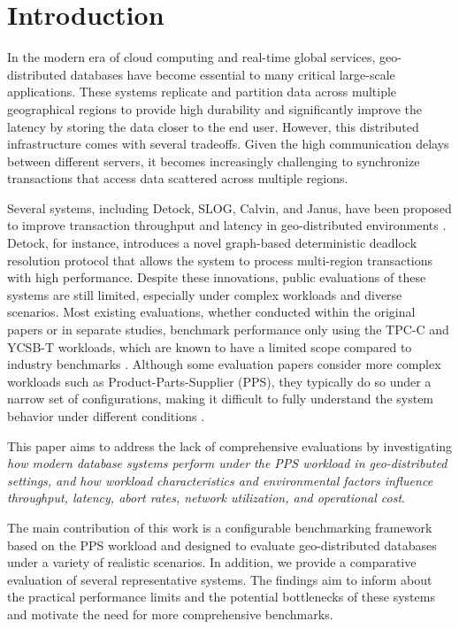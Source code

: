 \section{Introduction}
\label{sec: introduction}

In the modern era of cloud computing and real-time global services, geo-distributed databases have become essential to many critical large-scale applications. These systems replicate and partition data across multiple geographical regions to provide high durability and significantly improve the latency by storing the data closer to the end user. However, this distributed infrastructure comes with several tradeoffs. Given the high communication delays between different servers, it becomes increasingly challenging to synchronize transactions that access data scattered across multiple regions.

Several systems, including Detock, SLOG, Calvin, and Janus, have been proposed to improve transaction throughput and latency in geo-distributed environments \cite{nguyen2023detock, ren2019slog, thomson2012calvin, mu2016consolidating}. Detock, for instance, introduces a novel graph-based deterministic deadlock resolution protocol that allows the system to process multi-region transactions with high performance. Despite these innovations, public evaluations of these systems are still limited, especially under complex workloads and diverse scenarios. Most existing evaluations, whether conducted within the original papers or in separate studies, benchmark performance only using the TPC-C and YCSB-T workloads, which are known to have a limited scope compared to industry benchmarks \cite{ren2014evaluation}. Although some evaluation papers consider more complex workloads such as Product-Parts-Supplier (PPS), they typically do so under a narrow set of configurations, making it difficult to fully understand the system behavior under different conditions \cite{harding2017evaluation}.

This paper aims to address the lack of comprehensive evaluations by investigating \textit{how modern database systems perform under the PPS workload in geo-distributed settings, and how workload characteristics and environmental factors influence throughput, latency, abort rates, network utilization, and operational cost}.

The main contribution of this work is a configurable benchmarking framework based on the PPS workload and designed to evaluate geo-distributed databases under a variety of realistic scenarios. In addition, we provide a comparative evaluation of several representative systems. The findings aim to inform about the practical performance limits and the potential bottlenecks of these systems and motivate the need for more comprehensive benchmarks.

